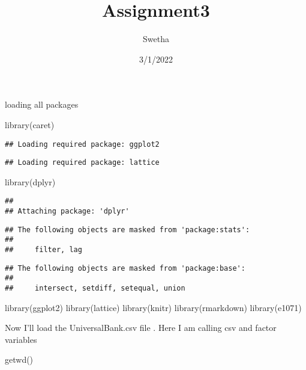 \documentclass[
]{article}
\title{Assignment3}
\author{Swetha}
\date{3/1/2022}
\newenvironment{Shaded}{\begin{snugshade}}{\end{snugshade}}
\newcommand{\FunctionTok}[1]{\textcolor[rgb]{0.00,0.00,0.00}{#1}}
\newcommand{\NormalTok}[1]{#1}
\begin{document}
\maketitle

loading all packages

\begin{Shaded}
\begin{Highlighting}[]
\FunctionTok{library}\NormalTok{(caret)}
\end{Highlighting}
\end{Shaded}

\begin{verbatim}
## Loading required package: ggplot2
\end{verbatim}

\begin{verbatim}
## Loading required package: lattice
\end{verbatim}

\begin{Shaded}
\begin{Highlighting}[]
\FunctionTok{library}\NormalTok{(dplyr)}
\end{Highlighting}
\end{Shaded}

\begin{verbatim}
## 
## Attaching package: 'dplyr'
\end{verbatim}

\begin{verbatim}
## The following objects are masked from 'package:stats':
## 
##     filter, lag
\end{verbatim}

\begin{verbatim}
## The following objects are masked from 'package:base':
## 
##     intersect, setdiff, setequal, union
\end{verbatim}

\begin{Shaded}
\begin{Highlighting}[]
\FunctionTok{library}\NormalTok{(ggplot2)}
\FunctionTok{library}\NormalTok{(lattice)}
\FunctionTok{library}\NormalTok{(knitr)}
\FunctionTok{library}\NormalTok{(rmarkdown)}
\FunctionTok{library}\NormalTok{(e1071)}
\end{Highlighting}
\end{Shaded}

Now I'll load the UniversalBank.csv file . Here I am calling csv and
factor variables

\begin{Shaded}
\begin{Highlighting}[]
\FunctionTok{getwd}\NormalTok{()}
\end{Highlighting}
\end{Shaded}
\end{document}
